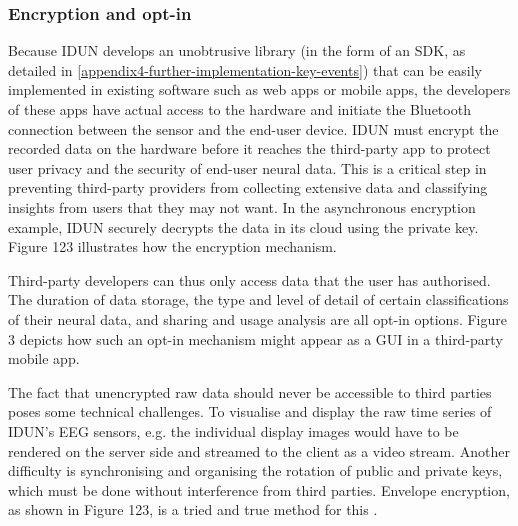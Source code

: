 
\subsubsection{Encryption and opt-in}
\label{chapter5-user-side-opt-in}

Because IDUN develops an unobtrusive library (in the form of an SDK, as detailed in \autoref{appendix4-further-implementation-key-events}) that can be easily implemented in existing software such as web apps or mobile apps, the developers of these apps have actual access to the hardware and initiate the Bluetooth connection between the sensor and the end-user device. IDUN must encrypt the recorded data on the hardware before it reaches the third-party app to protect user privacy and the security of end-user neural data. This is a critical step in preventing third-party providers from collecting extensive data and classifying insights from users that they may not want. In the asynchronous encryption example, IDUN securely decrypts the data in its cloud using the private key. Figure 123 illustrates how the encryption mechanism.


Third-party developers can thus only access data that the user has authorised. The duration of data storage, the type and level of detail of certain classifications of their neural data, and sharing and usage analysis are all opt-in options. Figure 3 depicts how such an opt-in mechanism might appear as a GUI in a third-party mobile app.


The fact that unencrypted raw data should never be accessible to third parties poses some technical challenges. To visualise and display the raw time series of IDUN's EEG sensors, e.g. the individual display images would have to be rendered on the server side and streamed to the client as a video stream. Another difficulty is synchronising and organising the rotation of public and private keys, which must be done without interference from third parties. Envelope encryption, as shown in Figure 123, is a tried and true method for this \citep{google_cloud_envelope_nodate}.


